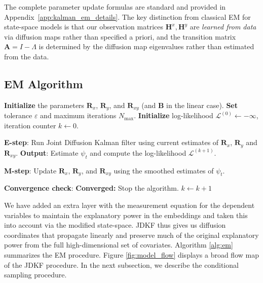 \documentclass[11pt]{article}
\theoremstyle{plain}
\theoremstyle{definition}
\theoremstyle{remark}
\numberwithin{equation}{section}
\newcommand{\veps}{\varepsilon}
\begin{document}
The complete parameter update formulas are standard and provided in Appendix~\ref{app:kalman_em_details}. The key distinction from classical EM for state-space models is that our observation matrices $\mathbf{H}^x, \mathbf{H}^y$ are \textit{learned from data} via diffusion maps rather than specified a priori, and the transition matrix $\mathbf{A} = I - \Lambda$ is determined by the diffusion map eigenvalues rather than estimated from the data.

\subsection{EM Algorithm}

\begin{algorithm}[H]
\caption{EM Algorithm Iteration}
\begin{algorithmic}[1]

\State \textbf{Initialize} the parameters $\mathbf{R}_x$, $\mathbf{R}_y$, and $\mathbf{R}_{xy}$ (and $\mathbf{B}$ in the linear case).
\State \textbf{Set} tolerance $\veps$ and maximum iterations $N_{\text{max}}$.
\State \textbf{Initialize} log-likelihood $\mathcal{L}^{(0)} \leftarrow -\infty$, iteration counter $k \leftarrow 0$.

    \State \textbf{E-step}: Run Joint Diffusion Kalman filter using current estimates of $\mathbf{R}_x$, $\mathbf{R}_y$ and $\mathbf{R}_{xy}$.
    \State \quad \textbf{Output}: Estimate $\psi_t$ and compute the log-likelihood $\mathcal{L}^{(k+1)}$.
    
    \State \textbf{M-step}: Update $\mathbf{R}_x$, $\mathbf{R}_y$, and $\mathbf{R}_{xy}$ using the smoothed estimates of $\psi_t$.
    
    \State \textbf{Convergence check}: 
    \If{ $\frac{|\mathcal{L}^{(k+1)} - \mathcal{L}^{(k)}|}{|\mathcal{L}^{(k)}|} < \veps$}
        \State \textbf{Converged:} Stop the algorithm.
    \Else
        \State $k \leftarrow k + 1$
    \EndIf
\EndWhile

\end{algorithmic}
\label{alg:em}
\end{algorithm}
 We have added an extra layer with the measurement equation for the dependent variables to maintain the explanatory power in the embeddings and taken this into account via the modified state-space. JDKF thus gives us diffusion coordinates that propagate linearly and preserve much of the original explanatory power from the full high-dimensional set of covariates. Algorithm \ref{alg:em} summarizes the EM procedure. Figure \ref{fig:model_flow} displays a broad flow map of the JDKF procedure. In the next subsection, we describe the conditional sampling procedure. 
\end{document}
